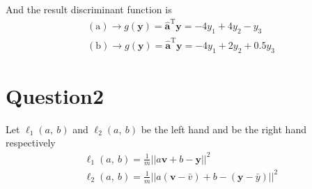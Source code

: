 \documentclass{article}
\begin{document}

And the result discriminant function is
\begin{gather*}
    (\mathrm{a}) \longrightarrow g(\boldsymbol{y}) 
    = \hat{\boldsymbol{a}}^{\mathrm{T}} \boldsymbol{y}
    = -4 y_{1} + 4 y_{2} - y_{3} \\
    (\mathrm{b}) \longrightarrow g(\boldsymbol{y}) 
    = \hat{\boldsymbol{a}}^{\mathrm{T}} \boldsymbol{y}
    = -4 y_{1} + 2 y_{2} + 0.5 y_{3}
\end{gather*}

\section*{Question2}

Let $\ell_{1}(a,\ b)$ and $\ell_{2}(a,\ b)$ be the left hand and be the right hand respectively
\begin{gather*}
    \ell_{1}(a,\ b) = \frac{1}{m} || a \boldsymbol{v} + b - \boldsymbol{y} ||^{2} \\
    \ell_{2}(a,\ b) = \frac{1}{m} || a (\boldsymbol{v} - \bar{v}) + b - (\boldsymbol{y} - \bar{y}) ||^{2}
\end{gather*}
\end{document}
